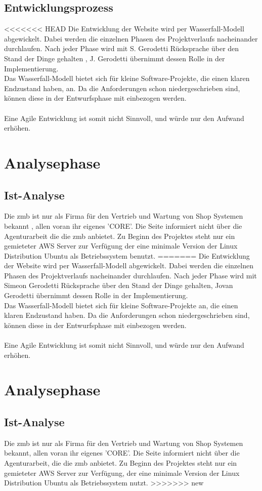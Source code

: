\documentclass[11pt,a4paper]{article}
\begin{document}
\subsection{Entwicklungsprozess}
<<<<<<< HEAD
Die Entwicklung der Website wird per Wasserfall-Modell abgewickelt. Dabei werden die einzelnen Phasen des Projektverlaufs nacheinander durchlaufen. Nach jeder Phase wird mit S. Gerodetti Rücksprache über den Stand der Dinge gehalten , J. Gerodetti übernimmt dessen Rolle in der Implementierung.\\
Das Wasserfall-Modell bietet sich für kleine Software-Projekte, die einen klaren Endzustand haben, an. Da die Anforderungen schon niedergeschrieben sind, können diese in der Entwurfsphase mit einbezogen werden. \\\\
Eine Agile Entwicklung ist somit nicht Sinnvoll, und würde nur den Aufwand erhöhen.
\section{Analysephase}
\subsection{Ist-Analyse}
Die zmb ist nur als Firma für den Vertrieb und Wartung von Shop Systemen bekannt , allen voran ihr eigenes 'CORE'. Die Seite informiert nicht über die Agenturarbeit die die zmb anbietet.
Zu Beginn des Projektes steht nur ein gemieteter AWS Server zur Verfügung der eine minimale   Version der Linux Distribution Ubuntu als Betriebssystem benutzt.
=======
Die Entwicklung der Website wird per Wasserfall-Modell abgewickelt. Dabei werden die einzelnen Phasen des Projektverlaufs nacheinander durchlaufen. Nach jeder Phase wird mit Simeon Gerodetti Rücksprache über den Stand der Dinge gehalten, Jovan Gerodetti übernimmt dessen Rolle in der Implementierung.\\
Das Wasserfall-Modell bietet sich für kleine Software-Projekte an, die einen klaren Endzustand haben. Da die Anforderungen schon niedergeschrieben sind, können diese in der Entwurfsphase mit einbezogen werden. \\\\
Eine Agile Entwicklung ist somit nicht Sinnvoll, und würde nur den Aufwand erhöhen.
\section{Analysephase}
\subsection{Ist-Analyse}
Die zmb ist nur als Firma für den Vertrieb und Wartung von Shop Systemen bekannt, allen voran ihr eigenes 'CORE'. Die Seite informiert nicht über die Agenturarbeit, die die zmb anbietet.
Zu Beginn des Projektes steht nur ein gemieteter AWS Server zur Verfügung, der eine minimale Version der Linux Distribution Ubuntu als Betriebssystem nutzt.
>>>>>>> new
\end{document}
